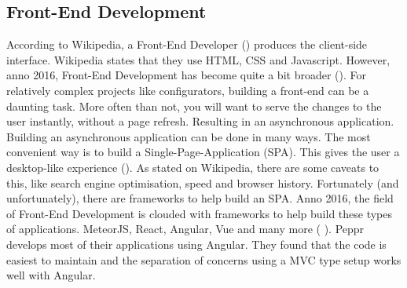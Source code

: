 \subsection{Front-End Development}
According to Wikipedia, a Front-End Developer (\cite{Front-End Developer Definition}) produces the client-side interface. Wikipedia states that they use HTML, CSS and Javascript. However, anno 2016, Front-End Development has become quite a bit broader (\cite{Javascript Anno 2016}). For relatively complex projects like configurators, building a front-end can be a daunting task. More often than not, you will want to serve the changes to the user instantly, without a page refresh. Resulting in an asynchronous application.
Building an asynchronous application can be done in many ways. The most convenient way is to build a Single-Page-Application (SPA). This gives the user a desktop-like experience (\cite{Single Page Applications}). As stated on Wikipedia, there are some caveats to this, like search engine optimisation, speed and browser history. Fortunately (and unfortunately), there are frameworks to help build an SPA. Anno 2016, the field of Front-End Development is clouded with frameworks to help build these types of applications. MeteorJS, React, Angular, Vue and many more (\cite{Front-End Javascript Frameworks} ).
Peppr develops most of their applications using Angular. They found that the code is easiest to maintain and the separation of concerns using a MVC type setup works well with Angular.

\newpage










